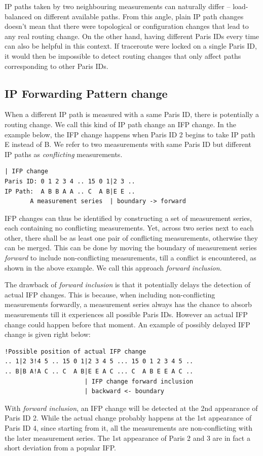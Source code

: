 IP paths taken by two neighbouring measurements can naturally differ -- 
load-balanced on different available paths.  
From this angle, plain IP path changes doesn't mean that there were topological or configuration changes that lead to any real routing change. 
On the other hand, having different Paris IDs every time can also be helpful in this context.  If traceroute were locked on a single Paris ID, it would then be impossible to detect routing changes that only affect paths corresponding to other Paris IDs.

\subsection{IP Forwarding Pattern change}
When a different IP path is measured with a same Paris ID,
there is potentially a routing change. We call this kind of IP path change an \ac{IFP} change.
In the example below, the IFP change happens when Paris ID 2 begins to take IP path E instead of B. We refer to two measurements with same Paris ID but different IP paths as \textit{conflicting} measurements.
\begin{Verbatim}[fontsize=\small]
                             | IFP change
Paris ID: 0 1 2 3 4 .. 15 0 1|2 3 ..
IP Path:  A B B A A .. C  A B|E E ..
       A measurement series  | boundary -> forward
\end{Verbatim}

IFP changes can thus be identified by constructing a set of measurement series, each containing no conflicting measurements. Yet, across two series next to each other, there shall be as least one pair of conflicting measurements, otherwise they can be merged.
This can be done by moving the boundary of measurement series \textit{forward} to include non-conflicting measurements, till a conflict is encountered, as shown in the above example.
We call this approach \textit{forward inclusion}.

The drawback of \textit{forward inclusion} is that it potentially delays the detection of actual IFP changes.
This is because, when including non-conflicting measurements forwardly, a measurement series always has the chance to absorb measurements till it experiences all possible Paris IDs.
However an actual IFP change could happen before that moment.
An example of possibly delayed IFP change is given right below:
\begin{Verbatim}[fontsize=\small]
        !Possible position of actual IFP change        
.. 1|2 3!4 5 .. 15 0 1|2 3 4 5 ... 15 0 1 2 3 4 5 ..
.. B|B A!A C .. C  A B|E E A C ... C  A B E E A C ..
                      | IFP change forward inclusion
                      | backward <- boundary
\end{Verbatim}
With \textit{forward inclusion}, an IFP change will be detected at the 2nd appearance of Paris ID 2.
While the actual change probably happens at the 1st appearance of Paris ID 4, since starting from it, all the measurements are non-conflicting with the later measurement series.
The 1st appearance of Paris 2 and 3 are in fact a short deviation from a popular IFP.

